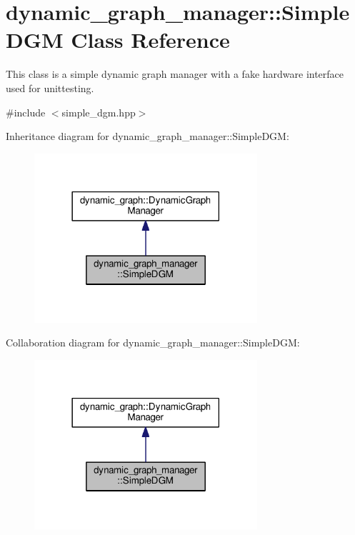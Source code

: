 \hypertarget{classdynamic__graph__manager_1_1SimpleDGM}{}\section{dynamic\+\_\+graph\+\_\+manager\+:\+:Simple\+D\+GM Class Reference}
\label{classdynamic__graph__manager_1_1SimpleDGM}


This class is a simple dynamic graph manager with a fake hardware interface used for unittesting.  




{\ttfamily \#include $<$simple\+\_\+dgm.\+hpp$>$}



Inheritance diagram for dynamic\+\_\+graph\+\_\+manager\+:\+:Simple\+D\+GM\+:
\nopagebreak
\begin{figure}[H]
\begin{center}
\leavevmode
\includegraphics[width=234pt]{classdynamic__graph__manager_1_1SimpleDGM__inherit__graph}
\end{center}
\end{figure}


Collaboration diagram for dynamic\+\_\+graph\+\_\+manager\+:\+:Simple\+D\+GM\+:
\nopagebreak
\begin{figure}[H]
\begin{center}
\leavevmode
\includegraphics[width=234pt]{classdynamic__graph__manager_1_1SimpleDGM__coll__graph}
\end{center}
\end{figure}
